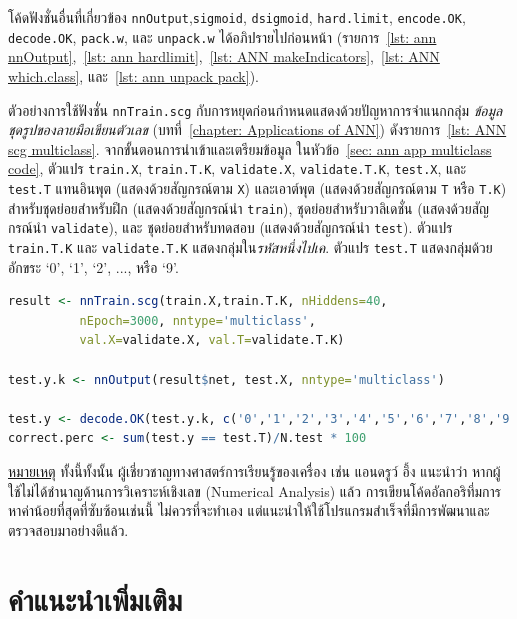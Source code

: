 โค้ดฟังชั่นอื่นที่เกี่ยวข้อง \texttt{nnOutput},\texttt{sigmoid}, \texttt{dsigmoid}, \texttt{hard.limit}, \texttt{encode.OK}, \texttt{decode.OK}, \texttt{pack.w}, และ \texttt{unpack.w} ได้อภิปรายไปก่อนหน้า (รายการ~\ref{lst: ann nnOutput},~\ref{lst: ann hardlimit},~\ref{lst: ANN makeIndicators},~\ref{lst: ANN which.class}, และ~\ref{lst: ann unpack pack}).

ตัวอย่างการใช้ฟังชั่น \texttt{nnTrain.scg} กับการหยุดก่อนกำหนดแสดงด้วยปัญหาการจำแนกกลุ่ม \textit{ข้อมูลชุดรูปของลายมือเขียนตัวเลข} (บทที่~\ref{chapter: Applications of ANN}) ดังรายการ~\ref{lst: ANN scg multiclass}.
จากขั้นตอนการนำเข้าและเตรียมข้อมูล ในหัวข้อ~\ref{sec: ann app multiclass code},
ตัวแปร \texttt{train.X}, \texttt{train.T.K},
\texttt{validate.X}, \texttt{validate.T.K},
\texttt{test.X}, และ \texttt{test.T} แทนอินพุต (แสดงด้วยสัญกรณ์ตาม \texttt{X}) และเอาต์พุต (แสดงด้วยสัญกรณ์ตาม \texttt{T} หรือ \texttt{T.K}) สำหรับชุดย่อยสำหรับฝึก (แสดงด้วยสัญกรณ์นำ \texttt{train}), ชุดย่อยสำหรับวาลิเดชั่น (แสดงด้วยสัญกรณ์นำ \texttt{validate}), และ ชุดย่อยสำหรับทดสอบ (แสดงด้วยสัญกรณ์นำ \texttt{test}).
ตัวแปร \texttt{train.T.K} และ \texttt{validate.T.K} แสดงกลุ่มใน\textit{รหัสหนึ่งไปเค}.
ตัวแปร \texttt{test.T} แสดงกลุ่มด้วยอักขระ `0', `1', `2', ..., หรือ `9'.

\begin{lstlisting}[language=R,caption={ตัวอย่างโค้ดฝึกและทดสอบโครงข่ายประสาทเทียมด้วยวิธีเอสซีจีสำหรับปัญหาข้อมูลชุดรูปของลายมือเขียนตัวเลข},
label={lst: ANN scg multiclass}]
result <- nnTrain.scg(train.X,train.T.K, nHiddens=40, 
          nEpoch=3000, nntype='multiclass',
          val.X=validate.X, val.T=validate.T.K)

test.y.k <- nnOutput(result$net, test.X, nntype='multiclass')

test.y <- decode.OK(test.y.k, c('0','1','2','3','4','5','6','7','8','9'))
correct.perc <- sum(test.y == test.T)/N.test * 100
\end{lstlisting}

\underline{หมายเหตุ} ทั้งนี้ทั้งนั้น ผู้เชี่ยวชาญทางศาสตร์การเรียนรู้ของเครื่อง เช่น แอนดรูว์ อึ้ง\cite{Ng2013a} แนะนำว่า หากผู้ใช้ไม่ได้ชำนาญด้านการวิเคราะห์เชิงเลข (Numerical Analysis) แล้ว การเขียนโค้ดอัลกอริทึ่มการหาค่าน้อยที่สุดที่ซับซ้อนเช่นนี้ ไม่ควรที่จะทำเอง แต่แนะนำให้ใช้โปรแกรมสำเร็จที่มีการพัฒนาและตรวจสอบมาอย่างดีแล้ว.

\section{คำแนะนำเพิ่มเติม}
\label{sec: ANN suggestions}

